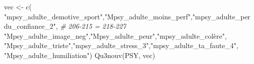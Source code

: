 \documentclass[
]{article}
\newenvironment{Shaded}{\begin{snugshade}}{\end{snugshade}}
\newcommand{\CommentTok}[1]{\textcolor[rgb]{0.56,0.35,0.01}{\textit{#1}}}
\newcommand{\FunctionTok}[1]{\textcolor[rgb]{0.00,0.00,0.00}{#1}}
\newcommand{\NormalTok}[1]{#1}
\newcommand{\OtherTok}[1]{\textcolor[rgb]{0.56,0.35,0.01}{#1}}
\newcommand{\StringTok}[1]{\textcolor[rgb]{0.31,0.60,0.02}{#1}}
\begin{document}
\begin{Shaded}
\begin{Highlighting}[]
\NormalTok{vec }\OtherTok{\textless{}{-}} \FunctionTok{c}\NormalTok{( }\StringTok{"mpsy\_adulte\_demotive\_sport"}\NormalTok{,}\StringTok{"Mpsy\_adulte\_moins\_perf"}\NormalTok{,}\StringTok{"mpsy\_adulte\_perdu\_confiance\_2"}\NormalTok{, }\CommentTok{\# 206{-}215 = 218{-}227}
     \StringTok{"Mpsy\_adulte\_image\_neg"}\NormalTok{,}\StringTok{"Mpsy\_adulte\_peur"}\NormalTok{,}\StringTok{"mpsy\_adulte\_colère"}\NormalTok{,}
     \StringTok{"Mpsy\_adulte\_triste"}\NormalTok{,}\StringTok{"mpsy\_adulte\_stress\_3"}\NormalTok{,}\StringTok{"mpsy\_adulte\_ta\_faute\_4"}\NormalTok{,}
     \StringTok{"Mpsy\_adulte\_humiliation"}\NormalTok{)}
\FunctionTok{Qu3nouv}\NormalTok{(PSY, vec)}
\end{Highlighting}
\end{Shaded}
\end{document}
